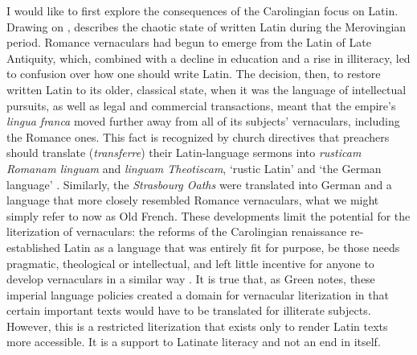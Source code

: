 I would like to first explore the consequences of the Carolingian focus on Latin. Drawing on \citet[12, 25]{vonSee1985}, \citet[42--43]{Green1994} describes the chaotic state of written Latin during the Merovingian period. Romance vernaculars had begun to emerge from the Latin of Late Antiquity, which, combined with a decline in education and a rise in illiteracy, led to confusion over how one should write Latin. The decision, then, to restore written Latin to its older, classical state, when it was the language of intellectual pursuits, as well as legal and commercial transactions, meant that the empire’s \textit{lingua franca} moved further away from all of its subjects’ vernaculars, including the Romance ones. This fact is recognized by church directives that preachers should translate (\textit{transferre}) their Latin-language sermons into \textit{rusticam Romanam linguam} and \textit{linguam Theotiscam}, ‘rustic Latin’ and ‘the German language’ \citep[43]{Green1994}. Similarly, the \textit{Strasbourg Oaths} were translated into German and a language that more closely resembled Romance vernaculars, what we might simply refer to now as Old French. These developments limit the potential for the literization of vernaculars: the reforms of the Carolingian renaissance re-established Latin as a language that was entirely fit for purpose, be those needs pragmatic, theological or intellectual, and left little incentive for anyone to develop vernaculars in a similar way \citep[42]{Green1994}. It is true that, as Green notes, these imperial language policies created a domain for vernacular literization in that certain important texts would have to be translated for illiterate subjects. However, this is a restricted literization that exists only to render Latin texts more accessible. It is a support to Latinate literacy and not an end in itself.

